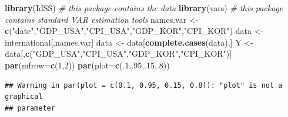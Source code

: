 \documentclass[
  12pt,
]{book}
\newenvironment{Shaded}{\begin{snugshade}}{\end{snugshade}}
\newcommand{\AttributeTok}[1]{\textcolor[rgb]{0.13,0.29,0.53}{#1}}
\newcommand{\CommentTok}[1]{\textcolor[rgb]{0.56,0.35,0.01}{\textit{#1}}}
\newcommand{\DecValTok}[1]{\textcolor[rgb]{0.00,0.00,0.81}{#1}}
\newcommand{\FunctionTok}[1]{\textcolor[rgb]{0.13,0.29,0.53}{\textbf{#1}}}
\newcommand{\NormalTok}[1]{#1}
\newcommand{\OtherTok}[1]{\textcolor[rgb]{0.56,0.35,0.01}{#1}}
\newcommand{\SpecialCharTok}[1]{\textcolor[rgb]{0.81,0.36,0.00}{\textbf{#1}}}
\newcommand{\StringTok}[1]{\textcolor[rgb]{0.31,0.60,0.02}{#1}}
\theoremstyle{definition}
\theoremstyle{definition}
\theoremstyle{definition}
\theoremstyle{definition}
\theoremstyle{remark}
\begin{document}
\begin{Shaded}
\begin{Highlighting}[]
\FunctionTok{library}\NormalTok{(IdSS) }\CommentTok{\# this package contains the data}
\FunctionTok{library}\NormalTok{(vars) }\CommentTok{\# this package contains standard VAR estimation tools}
\NormalTok{names.var }\OtherTok{\textless{}{-}} \FunctionTok{c}\NormalTok{(}\StringTok{"date"}\NormalTok{,}\StringTok{"GDP\_USA"}\NormalTok{,}\StringTok{"CPI\_USA"}\NormalTok{,}\StringTok{"GDP\_KOR"}\NormalTok{,}\StringTok{"CPI\_KOR"}\NormalTok{)}
\NormalTok{data }\OtherTok{\textless{}{-}}\NormalTok{ international[,names.var]}
\NormalTok{data }\OtherTok{\textless{}{-}}\NormalTok{ data[}\FunctionTok{complete.cases}\NormalTok{(data),]}
\NormalTok{Y }\OtherTok{\textless{}{-}}\NormalTok{ data[,}\FunctionTok{c}\NormalTok{(}\StringTok{"GDP\_USA"}\NormalTok{,}\StringTok{"CPI\_USA"}\NormalTok{,}\StringTok{"GDP\_KOR"}\NormalTok{,}\StringTok{"CPI\_KOR"}\NormalTok{)]}
\FunctionTok{par}\NormalTok{(}\AttributeTok{mfrow=}\FunctionTok{c}\NormalTok{(}\DecValTok{1}\NormalTok{,}\DecValTok{2}\NormalTok{))}
\FunctionTok{par}\NormalTok{(}\AttributeTok{plot=}\FunctionTok{c}\NormalTok{(.}\DecValTok{1}\NormalTok{,.}\DecValTok{95}\NormalTok{,.}\DecValTok{15}\NormalTok{,.}\DecValTok{8}\NormalTok{))}
\end{Highlighting}
\end{Shaded}

\begin{verbatim}
## Warning in par(plot = c(0.1, 0.95, 0.15, 0.8)): "plot" is not a graphical
## parameter
\end{verbatim}

\begin{Shaded}
\end{Shaded}
\end{document}
